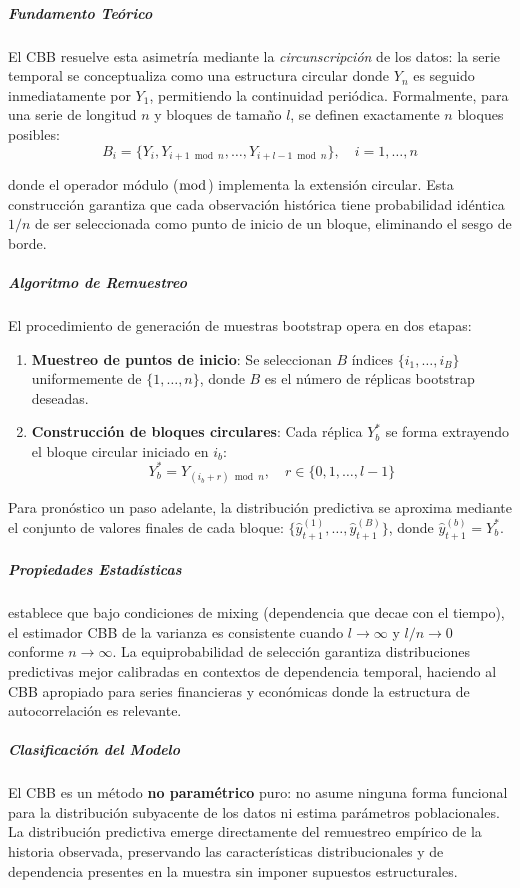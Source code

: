 \subparagraph{Fundamento Teórico}
El CBB resuelve esta asimetría mediante la \textit{circunscripción} de los datos: la serie temporal se conceptualiza como una estructura circular donde $Y_n$ es seguido inmediatamente por $Y_1$, permitiendo la continuidad periódica. Formalmente, para una serie de longitud $n$ y bloques de tamaño $l$, se definen exactamente $n$ bloques posibles:
\begin{equation}
B_i = \{Y_i, Y_{i+1 \bmod n}, \dots, Y_{i+l-1 \bmod n}\}, \quad i = 1,\dots,n
\end{equation}

donde el operador módulo ($\bmod$) implementa la extensión circular. Esta construcción garantiza que cada observación histórica tiene probabilidad idéntica $1/n$ de ser seleccionada como punto de inicio de un bloque, eliminando el sesgo de borde.

\subparagraph{Algoritmo de Remuestreo}
El procedimiento de generación de muestras bootstrap opera en dos etapas:

\begin{enumerate}
    \item \textbf{Muestreo de puntos de inicio}: Se seleccionan $B$ índices $\{i_1, \dots, i_B\}$ uniformemente de $\{1,\dots,n\}$, donde $B$ es el número de réplicas bootstrap deseadas.
    \item \textbf{Construcción de bloques circulares}: Cada réplica $Y^*_b$ se forma extrayendo el bloque circular iniciado en $i_b$:
    \begin{equation}
    Y^*_b = Y_{(i_b + r) \bmod n}, \quad r \in \{0, 1, \dots, l-1\}
    \end{equation}
\end{enumerate}

Para pronóstico un paso adelante, la distribución predictiva se aproxima mediante el conjunto de valores finales de cada bloque: $\{\hat{y}_{t+1}^{(1)}, \dots, \hat{y}_{t+1}^{(B)}\}$, donde $\hat{y}_{t+1}^{(b)} = Y^*_b$.

\subparagraph{Propiedades Estadísticas}
\textcite{Lahiri2003} establece que bajo condiciones de mixing (dependencia que decae con el tiempo), el estimador CBB de la varianza es consistente cuando $l \to \infty$ y $l/n \to 0$ conforme $n \to \infty$. La equiprobabilidad de selección garantiza distribuciones predictivas mejor calibradas en contextos de dependencia temporal, haciendo al CBB apropiado para series financieras y económicas donde la estructura de autocorrelación es relevante.

\subparagraph{Clasificación del Modelo}
El CBB es un método \textbf{no paramétrico} puro: no asume ninguna forma funcional para la distribución subyacente de los datos ni estima parámetros poblacionales. La distribución predictiva emerge directamente del remuestreo empírico de la historia observada, preservando las características distribucionales y de dependencia presentes en la muestra sin imponer supuestos estructurales.

